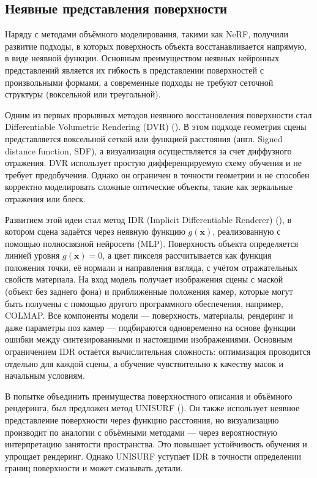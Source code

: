 \subsection{Неявные представления поверхности}

Наряду с методами объёмного моделирования, такими как NeRF, получили развитие
подходы, в которых поверхность объекта восстанавливается напрямую, в виде
неявной функции. Основным преимуществом неявных нейронных представлений является
их гибкость в представлении поверхностей с произвольными формами,
а современные подходы не требуют сеточной структуры (воксельной или треугольной).

Одним из первых прорывных методов неявного восстановления поверхности стал
Differentiable Volumetric Rendering (DVR)
(\cite{niemeyer2020differentiablevolumetricrenderinglearning}). В этом подходе
геометрия сцены представляется воксельной сеткой или функцией расстояния (англ.
Signed distance function, SDF), а визуализация осуществляется за счет диффузного
отражения. DVR использует простую дифференцируемую схему обучения и не требует
предобучения.  Однако он ограничен в точности геометрии и не способен корректно
моделировать сложные оптические объекты, такие как зеркальные отражения или блеск.

Развитием этой идеи стал метод IDR (Implicit Differentiable Renderer)
(\cite{yariv2020multiviewneuralsurfacereconstruction}), в котором сцена задаётся
через неявную функцию $g(\mathbf{x})$, реализованную с помощью полносвязной
нейросети (MLP). Поверхность объекта определяется линией уровня $g(\mathbf{x}) =
0$, а цвет пикселя рассчитывается как функция положения точки, её нормали и
направления взгляда, с учётом отражательных свойств материала. На вход модель
получает изображения сцены с маской (объект без заднего фона) и приближённые
положения камер, которые могут быть получены с помощью другого программного
обеспечения, например, COLMAP. Все компоненты модели — поверхность, материалы,
рендеринг и даже параметры поз камер — подбираются одновременно на основе
функции ошибки между синтезированными и настоящими изображениями. Основным
ограничением IDR остаётся вычислительная сложность: оптимизация проводится
отдельно для каждой сцены, а обучение чувствительно к качеству масок и начальным
условиям.

В попытке объединить преимущества поверхностного описания и объёмного
рендеринга, был предложен метод UNISURF
(\cite{oechsle2021unisurfunifyingneuralimplicit}). Он также использует неявное
представление поверхности через функцию расстояния, но визуализацию производит
по аналогии с объёмными методами — через вероятностную интерпретацию занятости
пространства. Это повышает устойчивость обучения и упрощает рендеринг. Однако
UNISURF уступает IDR в точности определении границ поверхности и может смазывать
детали.

